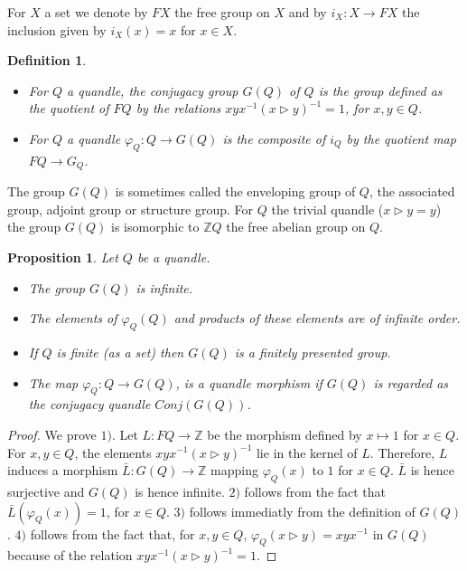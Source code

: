 \documentclass[12pt, reqno]{amsart}
\newtheorem{proposition}[theorem]{Proposition}
\newtheorem{definition}[theorem]{Definition}
\newcommand{\Z}{ {\mathbb Z} }
\begin{document}
For $X$ a set we denote by $FX$ the free group on $X$ and by $i_X :X\to FX$ the inclusion given by $i_X(x)=x$ for $x\in X$.
\begin{definition}
\begin{itemize}
\item[1)] For $Q$ a quandle, the conjugacy group $G(Q)$ of $Q$ is the group defined as the quotient of $FQ$ by the relations $xyx^{-1}(x\triangleright y)^{-1}=1$, for $x,y\in Q$.
\item[2)] For $Q$ a quandle $\varphi_Q :Q\to G(Q)$ is the composite of $i_Q$ by the quotient map $FQ\to G_Q$.
\end{itemize}
\end{definition}
The group $G(Q)$ is sometimes called the enveloping group of $Q$, the associated group, adjoint group or structure group. For $Q$ the trivial quandle ($x\triangleright y=y$) the group $G(Q)$ is isomorphic to $\Z Q$ the free abelian group on $Q$. 
\begin{proposition}
Let $Q$ be a quandle.
\begin{itemize}
\item[1)] The group $G(Q)$ is infinite.
\item[2)] The elements of $\varphi_Q(Q)$ and products of these elements are of infinite order.
\item[3)] If $Q$ is finite (as a set) then $G(Q)$ is a finitely presented group.
\item[4)] The map $\varphi_Q:Q\to G(Q)$, is a quandle morphism if $G(Q)$ is regarded as the conjugacy quandle $Conj(G(Q))$.
\end{itemize}
\end{proposition}
\begin{proof}
We prove $1)$. Let $L:FQ \to \Z$ be the morphism defined by $x\mapsto 1$ for $x\in Q$. For $x,y \in Q$, the elements $xyx^{-1}(x\triangleright y)^{-1}$ lie in the kernel of $L$. Therefore, $L$ induces a morphism $\bar{L} : G(Q)\to \Z$ mapping $\varphi_Q(x)$ to $1$ for $x\in Q$. $\bar{L}$ is hence surjective and $G(Q)$ is hence infinite. $2)$ follows from the fact that $\bar{L}(\varphi_Q(x))=1$, for $x\in Q$. $3)$ follows immediatly from the definition of $G(Q)$. $4)$ follows from the fact that, for $x,y\in Q$, $\varphi_Q(x\triangleright y)=xyx^{-1}$ in $G(Q)$ because of the relation $xyx^{-1}(x\triangleright y)^{-1}=1$.
\end{proof}
\end{document}
